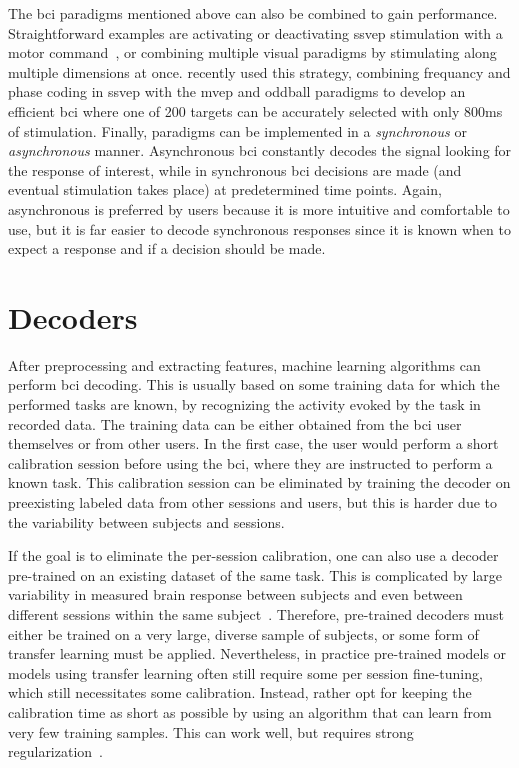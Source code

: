 The \ac{bci} paradigms mentioned above can also be combined to gain performance.
Straightforward examples are activating or deactivating \ac{ssvep} stimulation
with a motor command~\cite{Neeling2019}, or combining multiple visual paradigms by stimulating
along multiple dimensions at once.
\textcite{Han2023} recently used this strategy, combining frequancy and phase
coding in \ac{ssvep} with the \ac{mvep} and oddball paradigms to develop an
efficient \ac{bci} where one of 200 targets can be accurately selected with
only 800ms of stimulation.
Finally, paradigms can be implemented in a \emph{synchronous} or
\emph{asynchronous} manner.
Asynchronous \ac{bci} constantly decodes the signal looking for the response of
interest, while in synchronous \ac{bci} decisions are made (and eventual
stimulation takes place) at predetermined time points.
Again, asynchronous is preferred by users because it is more intuitive and
comfortable to use, but it is far easier to decode synchronous responses since
it is known when to expect a response and if a decision should be made.

\section{Decoders}
\label{sec:bci-decoding}

After preprocessing and extracting features, machine learning algorithms can perform \ac{bci}
decoding.
This is usually based on
some training data for which the performed tasks are known, by recognizing the
activity evoked by the task in recorded data.
The training data can be either obtained from the \ac{bci} user themselves or from
other users.
In the first case, the user would perform a short calibration session before
using the \ac{bci}, where they are instructed to perform a known task.
This calibration session can be eliminated by training the decoder on
preexisting labeled data from other sessions and users, but this is harder due
to the variability between subjects and sessions.


If the goal is to eliminate the per-session calibration, one can also use a
decoder pre-trained on an existing dataset of the same task.
This is complicated by large variability in measured brain response between subjects
and even between different sessions within the same
subject~\cite{Guger2009,Saha2020}.
Therefore, pre-trained decoders must either be trained on a very large, diverse
sample of subjects, or some form of transfer learning must be applied.
Nevertheless, in practice pre-trained models or models using transfer learning often still
require some per session fine-tuning, which still necessitates some
calibration.
Instead, rather opt for keeping the calibration time as short as possible by using
an algorithm that can learn from very few training samples.
This can work well, but requires strong regularization~\cite{VanDenKerchove2022}.

